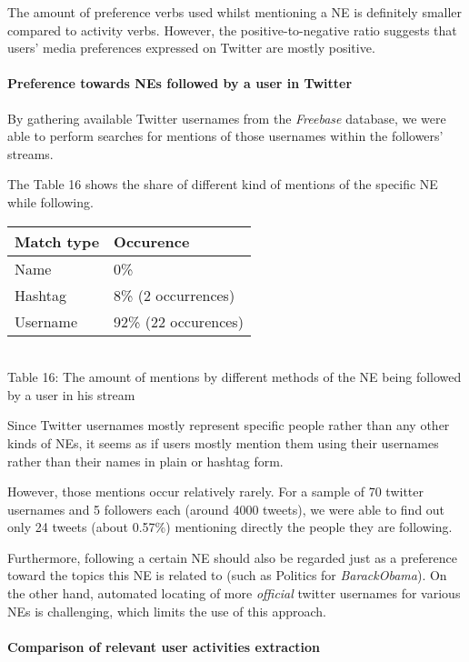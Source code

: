 The amount of preference verbs used whilst mentioning a NE is definitely
smaller compared to activity verbs. However, the positive-to-negative ratio suggests that users'
media preferences expressed on Twitter are mostly positive.

\paragraph{Preference towards NEs followed by a user in Twitter}
By gathering available Twitter usernames from the \textit{Freebase} database,
we were able to perform searches for mentions of those usernames within the followers' streams.

The Table 16 shows the share of different kind of mentions of the specific NE while following.

\begin{center}
  \begin{tabular}{ | p{3cm}| p{3.5cm} | } \hline
    Match type & Occurence \\ \hline
    Name & 0\% \\ \hline
    Hashtag & 8\% (2 occurrences) \\ \hline
    Username & 92\% (22 occurences) \\ \hline
  \end{tabular} \\
  Table 16: The amount of mentions by different methods of the NE being followed by a user in his stream \\
\end{center}

Since Twitter usernames mostly represent specific people rather than any other kinds of NEs, it seems as if users mostly
mention them using their usernames rather than their names in plain or hashtag form.

However, those mentions occur relatively rarely. For a sample of 70 twitter usernames and 5 followers each
(around 4000 tweets), we were able to find out only 24 tweets (about 0.57\%) mentioning directly the people they are following.

Furthermore, following a certain NE should also be regarded just as a preference toward the topics this NE is related to (such as Politics for \textit{BarackObama}). On the other hand, automated locating of more \textit{official} twitter usernames for various NEs is challenging, which
limits the use of this approach.

\paragraph{Comparison of relevant user activities extraction}

